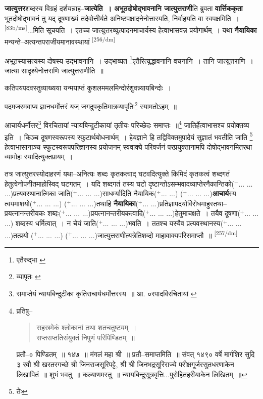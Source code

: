 \documentclass[article,12pt,a4paper]{memoir}
\newcommand{\add}[1]{($^{+}$#1)}
\begin{document}
	  \pstart \textbf{जात्युत्तर}शब्दस्य विग्रहं दर्शयन्नाह--\textbf{जात्येति । अभूतदोषोद्भावनानि जात्युत्तराणी}ति ब्रुवता \textbf{वार्त्तिककृता} भूतदोषोद्भावनं तु यद् दूषणाख्यं तदेवोत्तीर्यते अनिष्टपक्षादनेनोत्तारयति, निर्वाहयति वा स्वपक्षमिति । \leavevmode\textsuperscript{\rmlatinfont\tiny [83b/ms]}...मिति सूचयति । एतच्च जात्युत्तरव्युत्पादनमाचार्यस्य हेत्वाभासवन्न प्रयोगार्थम् । यथा \textbf{नैयायिका} मन्यन्ते--अत्यन्तपराजीयमानावस्थायां     \leavevmode\textsuperscript{\rmlatinfont\tiny [256/dm]} 
	  
	अभूतस्यासत्यस्य दोषस्य उद्भावनानि । उद्भाव्यत \footnote{एतैरुद्भा \cite{dp-msC}}एतैरित्युद्धावनानि वचनानि । तानि जात्युत्तराणि । जात्या सादृश्येनोत्तराणि जात्युत्तराणीति ॥ 
	  
	कतिपयपदवस्तुव्याख्यया यन्मयाप्तं कुशलममलमिन्दोरंशुवन्न्यायबिन्दोः । 
	  
	पदमजरमवाप्य ज्ञानधर्मोत्तरं यज् जगदुपकृतिमात्रव्यापृतिः\footnote{व्यापृतः \cite{dp-msC} \cite{dp-msD}} स्यामतोऽहम् ॥ 
	  
	आचार्यधर्मोत्तर\footnote{समाप्तेयं न्यायबिन्दुटीका कृतिराचार्यधर्मोत्तरस्य ॥ आ. ०रपादविरचितायां \cite{dp-msB} \cite{dp-msD}} विरचितायां न्यायबिन्दुटीकायां तृतीयः परिच्छेदः समाप्तः ॥\footnote{\cite{dp-msA} \cite{dp-msB} प्रतिषु--
	    \begin{verse}
	सहस्रमेकं श्लोकानां तथा शतचतुष्टयम् ।\\
	    सप्तसप्ततिसंयुक्तं निपुणं परिपिण्डितम् ॥\\
	    
	    \end{verse}
	   \cite{dp-msD} प्रतौ--० पिण्डितम् ॥ १४७ ॥ मंगलं महा श्री ॥ \cite{dp-msC} प्रतौ--समाप्तमिति ॥ संवत् १४९० वर्षे मार्गशिर सुदि ३ रवौ श्री खरतरगच्छे श्री जिनराजसूरिपट्टे, श्री श्री जिनभद्रसूरिराज्ये परीक्षगूर्जरसुतधरणाकेन लिखापितं ॥ शुभं भवतु ॥ कल्याणमस्तु ॥ न्यायबिन्दुसूत्रवृत्ति...पुरोहितहरीयाकेन लिखितम् ॥} जातिर्हेत्वाभासश्च प्रयोक्तव्य इति । किञ्च दूषणस्वरूपस्य स्फुटार्थबोधनार्थम् । हेयज्ञाने हि तद्विविक्तमुपादेयं सुज्ञातं भवतीति जाति \footnote{तेः} हेत्वाभासानाञ्च स्फुटस्वरूपपरिज्ञानस्य प्रयोजनम् स्ववाक्ये परिवर्जनं परप्रयुक्तानामपि दोषोद्भावनमितरथा व्यामोहः स्यादित्युक्तप्रायम् ।
	\pend
      

	  \pstart तत्र जात्युत्तरस्योदाहरणं यथा--अनित्यः शब्दः कृतकत्वाद् घटवदित्युक्ते किमिदं कृतकत्वं शब्दगतं हेतुत्वेनोपनीतमाहोस्विद् घटगतम् । यदि शब्दगतं तस्य घटो दृष्टान्तोऽसम्भवादव्याप्तेरनैकान्तिको\add{... ... ...}प्रत्यवस्थानात्मिका जाति\add{... ... ...}साधर्म्यादिति नैयायिक\add{... ...} \add{... ... ...}\textbf{आचार्य}स्य त्वयमाशयो\add{... ... ...} \add{... ... ...}तथाहि \textbf{नैयायिका}\add{... ...}प्रतिज्ञापदयोर्विरोधमाहुस्तथा--प्रयत्नानन्तरीयकः शब्दः\add{... ... ...}प्रयत्नानन्तरीयकत्वादि\add{... ... ...}हेतुमाचक्षते । तयैव दूषणा\add{... ... ...} शब्दस्य धर्मित्वात् । न चेयं जाति\add{... ... ...}भवति । ततश्च यस्यैव प्रत्यवस्थानस्य\add{... ... ...}तत्प्रयो \add{... ... ...} \add{... ... ...}जात्युत्तराणीत्यत्रेतिशब्दो माहावाक्यपरिसमाप्तौ ॥
	\pend
      \leavevmode\textsuperscript{\rmlatinfont\tiny [257/dm]}
\end{document}

